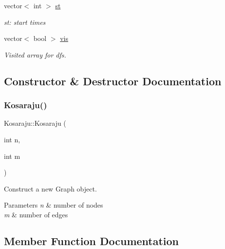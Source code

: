 \begin{DoxyCompactItemize}
\mbox{\label{classKosaraju_a9a6421e6566b0f8f8a029708515eb7de}} 
vector$<$ int $>$ \mbox{\hyperlink{classKosaraju_a9a6421e6566b0f8f8a029708515eb7de}{st}}
\begin{DoxyCompactList}\small\item\em st\+: start times \end{DoxyCompactList}\item 
\mbox{\label{classKosaraju_a9ac1cae2856629fe4ccd4586b2fea916}} 
vector$<$ bool $>$ \mbox{\hyperlink{classKosaraju_a9ac1cae2856629fe4ccd4586b2fea916}{vis}}
\begin{DoxyCompactList}\small\item\em Visited array for dfs. \end{DoxyCompactList}\end{DoxyCompactItemize}


\subsection{Constructor \& Destructor Documentation}
\mbox{\label{classKosaraju_a0ef4ff4f55746c3a1a73a1209edfa148}} 
\subsubsection{\texorpdfstring{Kosaraju()}{Kosaraju()}}
{\footnotesize\ttfamily Kosaraju\+::\+Kosaraju (\begin{DoxyParamCaption}\item[{int}]{n,  }\item[{int}]{m }\end{DoxyParamCaption})}



Construct a new Graph object. 


\begin{DoxyParams}{Parameters}
{\em n} & number of nodes \\
\hline
{\em m} & number of edges \\
\hline
\end{DoxyParams}


\subsection{Member Function Documentation}
\mbox{\label{classKosaraju_a5823c2fbedc3a02653c78277138b9d55}} 
